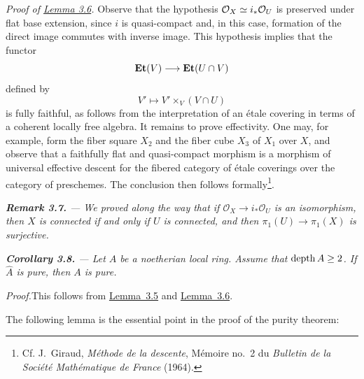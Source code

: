 \medskip
\noindent\textit{Proof of \hyperref[X.3.6]{Lemma 3.6}.}\quad
Observe that the hypothesis
$\mathcal O_X\simeq i_*\mathcal O_U$ is preserved under flat base extension, since $i$ is
quasi-compact and, in this case, formation of the direct image commutes with
inverse image. This hypothesis implies that the functor
\[
  \mathbf{Et}(V)\longrightarrow\mathbf{Et}(U\cap V)
\]
defined by
\[
  V'\longmapsto V'\times_V(V\cap U)
\]
is fully faithful, as follows from the interpretation of an étale covering
in terms of a coherent locally free algebra. It remains to prove effectivity.
One may, for example, form the fiber square $X_2$ and the fiber cube $X_3$ of
$X_1$ over $X$, and observe that a faithfully flat and quasi-compact
morphism is a morphism of universal effective descent for the fibered
category of étale coverings over the category of preschemes. The conclusion
then follows formally\renewcommand{\thefootnote}{(*)}\footnote{Cf. J.~Giraud,
\emph{Méthode de la descente}, Mémoire no.~2 du \emph{Bulletin de la Société
Mathématique de France} (1964).}.

\medskip
{\itshape
{}\noindent\textbf{Remark 3.7.} --- We proved along the way that if
$\mathcal O_X\to i_*\mathcal O_U$ is an isomorphism, then $X$ is connected if
and only if $U$ is connected, and then $\pi_1(U)\to\pi_1(X)$ is surjective.
}

\medskip
{\itshape
{}\noindent\textbf{Corollary 3.8.} --- Let $A$ be a noetherian local ring.
Assume that $\operatorname{depth} A\geq 2$. If $\widehat{A}$ is pure, then $A$ is pure.
}

\medskip
\noindent\emph{Proof.}\quad This follows from \hyperref[X.3.5]{Lemma~3.5} and \hyperref[X.3.6]{Lemma~3.6}.

\medskip
\noindent The following lemma is the essential point in the proof of the purity theorem:


